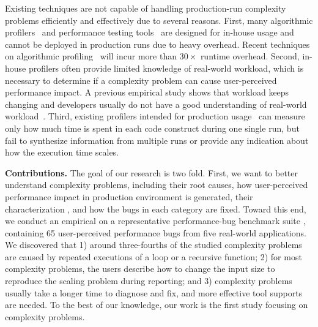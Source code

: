 Existing techniques
are not capable of handling production-run complexity problems
efficiently and effectively due to several reasons. 
First, many algorithmic profilers~\cite{Aprof1,Aprof2,AlgoProf} and performance 
testing tools~\cite{Alabama,PerfBlower} are designed for in-house usage and cannot be 
deployed in production runs due to heavy overhead. 
Recent techniques on algorithmic 
profiling~\cite{Aprof1,Aprof2,AlgoProf} will incur more than $30\times$ runtime overhead.
Second, in-house profilers often {\color{red} provide} limited knowledge of real-world workload, which is necessary 
to determine if a complexity problem can cause user-perceived performance 
impact. A previous empirical study shows that workload keeps changing and 
developers usually do not have a good understanding of real-world workload~\citep{PerfBug}.  
Third, existing profilers intended for production usage~\cite{gprof,oprofile,LagHunter,IntroPerf}
can measure only how much time 
is spent in each code construct during one single run,
but fail to synthesize information from multiple runs
or provide any indication about how the execution time scales.


\noindent\textbf{Contributions.}
\label{sec:con}
%
The goal of our research is two fold. First, we want to better 
understand  complexity problems, including 
their root causes, how user-perceived performance impact 
in production environment is generated,
their characterization , 
and how the bugs in each category are
fixed.  Toward this end, 
we conduct an empirical on a representative
performance-bug benchmark suite \cite{PerfBug,SongOOPSLA2014},
containing 65 user-perceived  performance bugs from five
real-world applications.  We discovered that 
1) around three-fourths of the studied complexity problems are
caused by repeated executions of a loop or a recursive function;
2) for most complexity problems,
the users describe how to change the input size to reproduce the scaling problem during reporting;
and 3) complexity problems usually take a longer time to diagnose and fix,
and more effective tool supports are needed. 
To the best of our knowledge, our work is the first study focusing on complexity problems.



